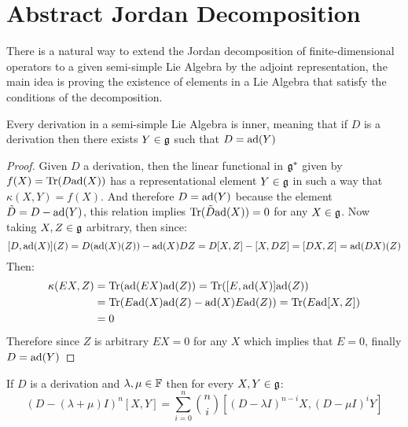 \section{Abstract Jordan Decomposition}
There is a natural way to extend the Jordan decomposition of finite-dimensional operators to a given semi-simple Lie Algebra by the adjoint representation, the main idea is proving the existence of elements in a Lie Algebra that satisfy the conditions of the decomposition.\\
\begin{lema}
Every derivation in a semi-simple Lie Algebra is inner, meaning that if $D$ is a derivation then there exists $Y \in \mathfrak{g}$ such that $D=\text{ad}(Y)$
\label{InnerDerivations}
\end{lema}
\begin{proof}
Given $D$ a derivation, then the linear functional in $\mathfrak{g}^*$ given by $f(X) = \text{Tr}(D\text{ad}(X))$ has a representational element $Y \in \mathfrak{g}$ in such a way that $\kappa(X,Y) = f(X)$. And therefore $D=\text{ad}(Y)$ because the element $\tilde{D} = D - \text{ad}(Y)$, this relation implies $\text{Tr}(\tilde{D}\text{ad}(X))=0$ for any $X \in \mathfrak{g}$. Now taking $X,Z \in \mathfrak{g}$ arbitrary, then since:
$$[D,\text{ad}(X)](Z) = D(\text{ad}(X)(Z)) - \text{ad}(X)DZ = D[X,Z] - [X,DZ] = [DX,Z] = \text{ad}(DX)(Z)$$
Then:
\begin{align*}
\kappa(EX,Z) &= \text{Tr}(\text{ad}(EX)\text{ad}(Z)) = \text{Tr}([E,\text{ad}(X)]\text{ad}(Z))\\
&= \text{Tr}(E\text{ad}(X)\text{ad}(Z) - \text{ad}(X)E\text{ad}(Z)) = \text{Tr}(E\text{ad}[X,Z])\\
&= 0
\end{align*}
Therefore since $Z$ is arbitrary $EX=0$ for any $X$ which implies that $E=0$, finally $D=\text{ad}(Y)$
\end{proof}
\begin{lema} 
	If $D$ is a derivation and $\lambda,\mu\in \mathbb{F}$ then for every $X,Y \in \mathfrak{g}$:
	$$(D-(\lambda+\mu)I)^n[X,Y] = \sum_{i=0}^n {n \choose i}[(D-\lambda I)^{n-i}X,(D-\mu I)^iY]$$
	\label{LeibnizProductFormula}
\end{lema}

